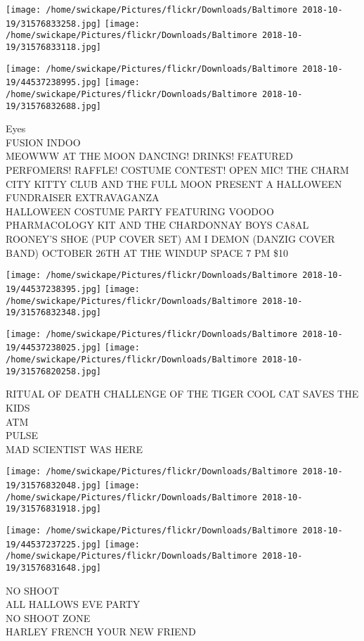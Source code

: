 \documentclass[10pt,letterpaper]{article}
\begin{document}
\texttt{[image: /home/swickape/Pictures/flickr/Downloads/Baltimore 2018-10-19/31576833258.jpg]}
\texttt{[image: /home/swickape/Pictures/flickr/Downloads/Baltimore 2018-10-19/31576833118.jpg]}

\texttt{[image: /home/swickape/Pictures/flickr/Downloads/Baltimore 2018-10-19/44537238995.jpg]}
\texttt{[image: /home/swickape/Pictures/flickr/Downloads/Baltimore 2018-10-19/31576832688.jpg]}

Eyes\\
FUSION INDOO\\
MEOWWW AT THE MOON DANCING!  DRINKS!  FEATURED PERFOMERS!  RAFFLE!  COSTUME CONTEST!  OPEN MIC!  THE CHARM CITY KITTY CLUB AND THE FULL MOON PRESENT A HALLOWEEN FUNDRAISER EXTRAVAGANZA\\
HALLOWEEN COSTUME PARTY FEATURING VOODOO PHARMACOLOGY KIT AND THE CHARDONNAY BOYS CA8AL ROONEY'S SHOE (PUP COVER SET) AM I DEMON (DANZIG COVER BAND) OCTOBER 26TH AT THE WINDUP SPACE 7 PM \$10
\pagebreak

\texttt{[image: /home/swickape/Pictures/flickr/Downloads/Baltimore 2018-10-19/44537238395.jpg]}
\texttt{[image: /home/swickape/Pictures/flickr/Downloads/Baltimore 2018-10-19/31576832348.jpg]}

\texttt{[image: /home/swickape/Pictures/flickr/Downloads/Baltimore 2018-10-19/44537238025.jpg]}
\texttt{[image: /home/swickape/Pictures/flickr/Downloads/Baltimore 2018-10-19/31576820258.jpg]}

RITUAL OF DEATH CHALLENGE OF THE TIGER COOL CAT SAVES THE KIDS\\
ATM\\
PULSE\\
MAD SCIENTIST WAS HERE
\pagebreak

\texttt{[image: /home/swickape/Pictures/flickr/Downloads/Baltimore 2018-10-19/31576832048.jpg]}
\texttt{[image: /home/swickape/Pictures/flickr/Downloads/Baltimore 2018-10-19/31576831918.jpg]}

\texttt{[image: /home/swickape/Pictures/flickr/Downloads/Baltimore 2018-10-19/44537237225.jpg]}
\texttt{[image: /home/swickape/Pictures/flickr/Downloads/Baltimore 2018-10-19/31576831648.jpg]}

NO SHOOT\\
ALL HALLOWS EVE PARTY\\
NO SHOOT ZONE\\
HARLEY FRENCH YOUR NEW FRIEND
\pagebreak
\end{document}
